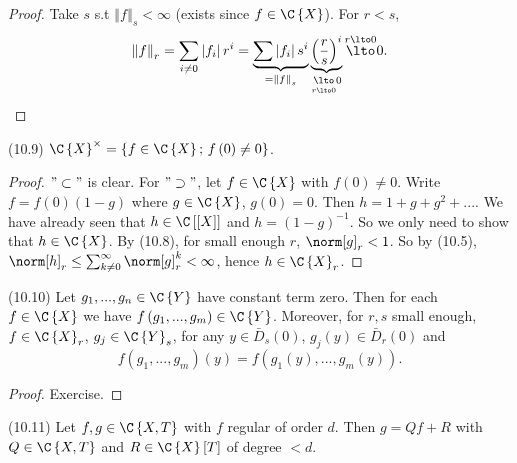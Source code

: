 \begin{proof}
Take $s$ s.t $\left\Vert f\right\Vert _{s}<\infty$ (exists since
$f\in\C\left\{ X\right\} $). For $r<s$, 
\[
\left\Vert f\right\Vert _{r}=\sum_{i\neq0}\left|f_{i}\right|r^{i}=\underbrace{\sum\left|f_{i}\right|s^{i}}_{=\left\Vert f\right\Vert _{s}}\underbrace{\left(\frac{r}{s}\right)^{i}}_{\underset{r\lto0}{\lto}0}\overset{r\lto0}{\lto}0.
\]
\end{proof}
\begin{cor*}
(10.9) $\C\left\{ X\right\} ^{\times}=\left\{ f\in\C\left\{ X\right\} ;\, f\left(0\right)\neq0\right\} $.\end{cor*}
\begin{proof}
$"\subset"$ is clear. For $"\supset"$, let $f\in\C\left\{ X\right\} $
with $f\left(0\right)\neq0$. Write $f=f\left(0\right)\left(1-g\right)$
where $g\in\C\left\{ X\right\} $, $g\left(0\right)=0$. Then $h=1+g+g^{2}+...$.
We have already seen that $h\in\C\left[\left[X\right]\right]$ and
$h=\left(1-g\right)^{-1}$. So we only need to show that $h\in\C\left\{ X\right\} $.
By (10.8), for small enough $r$, $\norm[g]_{r}<1$. So by (10.5),
$\norm[h]_{r}\leq\sum_{k\neq0}^{\infty}\norm[g]_{r}^{k}<\infty$,
hence $h\in\C\left\{ X\right\} _{r}$.\end{proof}
\begin{lemma*}
(10.10) Let $g_{1},...,g_{n}\in\C\left\{ Y\right\} $ have constant
term zero. Then for each $f\in\C\left\{ X\right\} $ we have $f\left(g_{1},...,g_{m}\right)\in\C\left\{ Y\right\} $.
Moreover, for $r,s$ small enough, $f\in\C\left\{ X\right\} _{r}$,
$g_{j}\in\C\left\{ Y\right\} _{s}$, for any $y\in\bar{D}_{s}\left(0\right)$,
$g_{j}\left(y\right)\in\bar{D}_{r}\left(0\right)$ and
\[
f\left(g_{1},...,g_{m}\right)\left(y\right)=f\left(g_{1}\left(y\right),...,g_{m}\left(y\right)\right).
\]
\end{lemma*}
\begin{proof}
Exercise.\end{proof}
\begin{theorem*}
(10.11) Let $f,g\in\C\left\{ X,T\right\} $ with $f$ regular of order
$d$. Then $g=Qf+R$ with $Q\in\C\left\{ X,T\right\} $ and $R\in\C\left\{ X\right\} \left[T\right]$
of degree $<d$.\end{theorem*}
